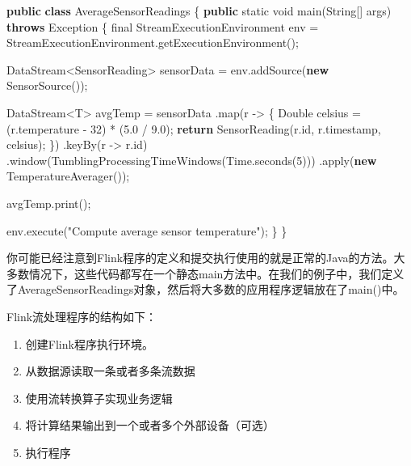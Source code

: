 \documentclass[cn,11pt,chinese]{elegantbook}
\newenvironment{Shaded}{}{}
\newcommand{\BuiltInTok}[1]{#1}
\newcommand{\DataTypeTok}[1]{\textcolor[rgb]{0.56,0.13,0.00}{#1}}
\newcommand{\DecValTok}[1]{\textcolor[rgb]{0.25,0.63,0.44}{#1}}
\newcommand{\FloatTok}[1]{\textcolor[rgb]{0.25,0.63,0.44}{#1}}
\newcommand{\FunctionTok}[1]{\textcolor[rgb]{0.02,0.16,0.49}{#1}}
\newcommand{\KeywordTok}[1]{\textcolor[rgb]{0.00,0.44,0.13}{\textbf{#1}}}
\newcommand{\NormalTok}[1]{#1}
\newcommand{\StringTok}[1]{\textcolor[rgb]{0.25,0.44,0.63}{#1}}
\providecommand{\tightlist}{%
  \setlength{\itemsep}{0pt}\setlength{\parskip}{0pt}}
\begin{document}
\begin{Shaded}
\begin{Highlighting}[]
\KeywordTok{public} \KeywordTok{class}\NormalTok{ AverageSensorReadings \{}
  \KeywordTok{public} \DataTypeTok{static} \DataTypeTok{void} \FunctionTok{main}\NormalTok{(}\BuiltInTok{String}\NormalTok{[] args) }\KeywordTok{throws} \BuiltInTok{Exception}\NormalTok{ \{}
    \DataTypeTok{final}\NormalTok{ StreamExecutionEnvironment env = StreamExecutionEnvironment.}\FunctionTok{getExecutionEnvironment}\NormalTok{();}

\NormalTok{    DataStream\textless{}SensorReading\textgreater{} sensorData = env.}\FunctionTok{addSource}\NormalTok{(}\KeywordTok{new} \FunctionTok{SensorSource}\NormalTok{());}

\NormalTok{    DataStream\textless{}T\textgreater{} avgTemp = sensorData}
\NormalTok{      .}\FunctionTok{map}\NormalTok{(r {-}\textgreater{} \{}
        \BuiltInTok{Double}\NormalTok{ celsius = (r.}\FunctionTok{temperature}\NormalTok{ {-} }\DecValTok{32}\NormalTok{) * (}\FloatTok{5.}\DecValTok{0}\NormalTok{ / }\FloatTok{9.}\DecValTok{0}\NormalTok{);}
        \KeywordTok{return} \FunctionTok{SensorReading}\NormalTok{(r.}\FunctionTok{id}\NormalTok{, r.}\FunctionTok{timestamp}\NormalTok{, celsius);}
\NormalTok{      \})}
\NormalTok{      .}\FunctionTok{keyBy}\NormalTok{(r {-}\textgreater{} r.}\FunctionTok{id}\NormalTok{)}
\NormalTok{      .}\FunctionTok{window}\NormalTok{(}\FunctionTok{TumblingProcessingTimeWindows}\NormalTok{(}\BuiltInTok{Time}\NormalTok{.}\FunctionTok{seconds}\NormalTok{(}\DecValTok{5}\NormalTok{)))}
\NormalTok{      .}\FunctionTok{apply}\NormalTok{(}\KeywordTok{new} \FunctionTok{TemperatureAverager}\NormalTok{());}

\NormalTok{    avgTemp.}\FunctionTok{print}\NormalTok{();}

\NormalTok{    env.}\FunctionTok{execute}\NormalTok{(}\StringTok{"Compute average sensor temperature"}\NormalTok{);}
\NormalTok{  \}}
\NormalTok{\}}
\end{Highlighting}
\end{Shaded}

你可能已经注意到Flink程序的定义和提交执行使用的就是正常的Java的方法。大多数情况下，这些代码都写在一个静态main方法中。在我们的例子中，我们定义了AverageSensorReadings对象，然后将大多数的应用程序逻辑放在了main()中。

Flink流处理程序的结构如下：

\begin{enumerate}
\def\labelenumi{\arabic{enumi}.}
\tightlist
\item
  创建Flink程序执行环境。
\item
  从数据源读取一条或者多条流数据
\item
  使用流转换算子实现业务逻辑
\item
  将计算结果输出到一个或者多个外部设备（可选）
\item
  执行程序
\end{enumerate}
\end{document}
